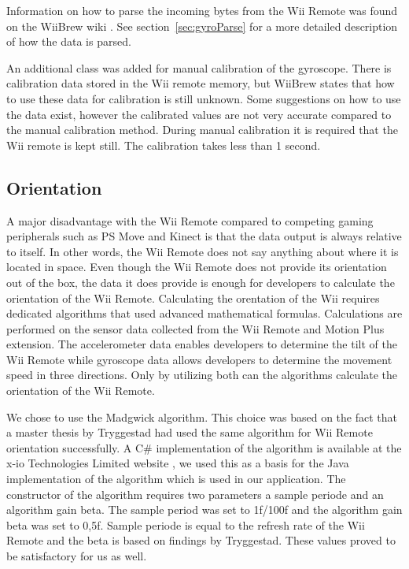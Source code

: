 Information on how to parse the incoming bytes from the Wii Remote was found on the WiiBrew wiki \cite{wiiBrew}. See section~\ref{sec:gyroParse} for a more detailed description of how the data is parsed. 

An additional class was added for manual calibration of the gyroscope. There is calibration data stored in the Wii remote memory, but WiiBrew states that how to use these data for calibration is still unknown. Some suggestions on how to use the data exist, however the calibrated values are not very accurate compared to the manual calibration method. During manual calibration it is required that the Wii remote is kept still. The calibration takes less than 1 second.

\subsection{Orientation}
A major disadvantage with the Wii Remote compared to competing gaming peripherals such as PS Move and Kinect is that the data output is always relative to itself. In other words, the Wii Remote does not say anything about where it is located in space. Even though the Wii Remote does not provide its orientation out of the box, the data it does provide is enough for developers to calculate the orientation of the Wii Remote. Calculating the orentation of the Wii requires dedicated algorithms that used advanced mathematical formulas. Calculations are performed on the sensor data collected from the Wii Remote and Motion Plus extension. The accelerometer data enables developers to determine the tilt of the Wii Remote while gyroscope data allows developers to determine the movement speed in three directions. Only by utilizing both can the algorithms calculate the orientation of the Wii Remote.

We chose to use the Madgwick algorithm\cite{madgwick}. This choice was based on the fact that a master thesis by Tryggestad\cite{Tryggestad} had used the same algorithm for Wii Remote orientation successfully. A C\# implementation of the algorithm is available at the x-io Technologies Limited website \cite{opensourceMadgwick}, we used this as a basis for the Java implementation of the algorithm which is used in our application. The constructor of the algorithm requires two parameters a sample periode and an algorithm gain beta. The sample period was set to 1f/100f and the algorithm gain beta was set to 0,5f. Sample periode is equal to the refresh rate of the Wii Remote and the beta is based on findings by Tryggestad. These values proved to be satisfactory for us as well.

